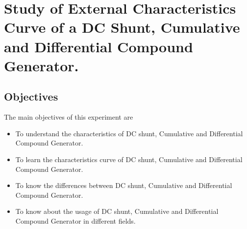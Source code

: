 

\chapter{Study of External Characteristics Curve of a DC Shunt, Cumulative and Differential Compound Generator.}
\label{exp3}


\section{Objectives}
The main objectives of this experiment are
\begin{itemize}
    \item To understand the characteristics of DC shunt, Cumulative and Differential Compound Generator.
    \item To learn the characteristics curve of DC shunt, Cumulative and Differential Compound Generator.
    \item To know the differences between DC shunt, Cumulative and Differential Compound Generator.
    \item To know about the usage of DC shunt, Cumulative and Differential Compound Generator in different fields.
\end{itemize}


